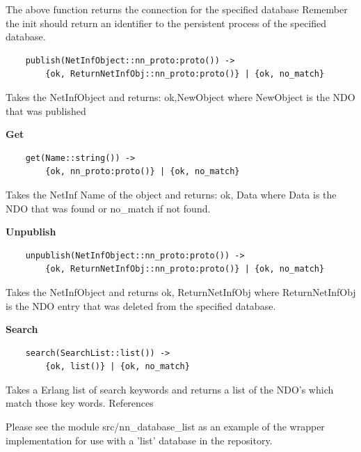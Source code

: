 The above function returns the connection for the specified database
Remember the init should return an identifier to the persistent process of the specified database.

\begin {verbatim}
    publish(NetInfObject::nn_proto:proto()) -> 
    	{ok, ReturnNetInfObj::nn_proto:proto()} | {ok, no_match}
\end{verbatim}

Takes the NetInfObject and returns: {ok,NewObject} where NewObject is the NDO that was published

\textbf{Get}

\begin {verbatim}
    get(Name::string()) -> 
    	{ok, nn_proto:proto()} | {ok, no_match}
\end{verbatim}

Takes the NetInf Name of the object and returns: {ok, Data} where Data is the NDO that was found or no\_match if not found.

\textbf{Unpublish}

\begin {verbatim}
    unpublish(NetInfObject::nn_proto:proto()) -> 
    	{ok, ReturnNetInfObj::nn_proto:proto()} | {ok, no_match}
\end{verbatim}

Takes the NetInfObject and returns {ok, ReturnNetInfObj} where ReturnNetInfObj is the NDO entry that was deleted from the specified database.

\textbf{Search}

\begin {verbatim}
    search(SearchList::list()) -> 
    	{ok, list()} | {ok, no_match}
\end{verbatim}

Takes a Erlang list of search keywords and returns a list of the NDO's which match those key words.
References

Please see the module src/nn\_database\_list as an example of the wrapper implementation for use with a 'list' database in the repository.
